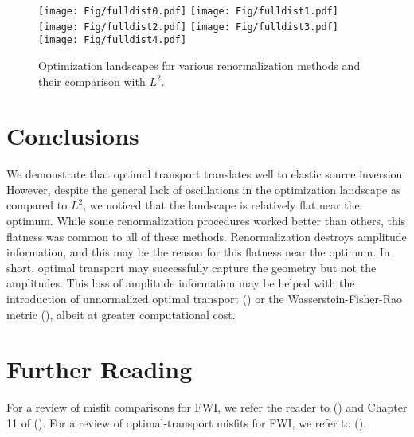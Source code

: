 \documentclass[paper,onecolumn,twoside]{geophysics}
\begin{document}
\begin{figure}
\texttt{[image: Fig/fulldist0.pdf]}
\texttt{[image: Fig/fulldist1.pdf]}
\texttt{[image: Fig/fulldist2.pdf]}
\texttt{[image: Fig/fulldist3.pdf]}
\texttt{[image: Fig/fulldist4.pdf]}
\caption{Optimization landscapes for various renormalization methods and their comparison with $L^2$.}
\label{fig:iaspopt}
\end{figure}

\section{Conclusions}
We demonstrate that optimal transport translates well to elastic source inversion. However, despite the general lack of oscillations in the optimization landscape as compared to $L^2$, we noticed that the landscape is relatively flat near the optimum. While some renormalization procedures worked better than others, this flatness was common to all of these methods. Renormalization destroys amplitude information, and this may be the reason for this flatness near the optimum. In short, optimal transport may successfully capture the geometry but not the amplitudes. This loss of amplitude information may be helped with the introduction of unnormalized optimal transport (\cite{gangbo2019unnormalized}) or the Wasserstein-Fisher-Rao metric (\cite{zhou2018wasserstein}), albeit at greater computational cost. 

\section{Further Reading}
For a review of misfit comparisons for FWI, we refer the reader to (\cite{brossier2010data}) and Chapter 11 of (\cite{fichtner2010full}). For a review of optimal-transport misfits for FWI, we refer to (\cite{metivier2022review}).  



\end{document}
